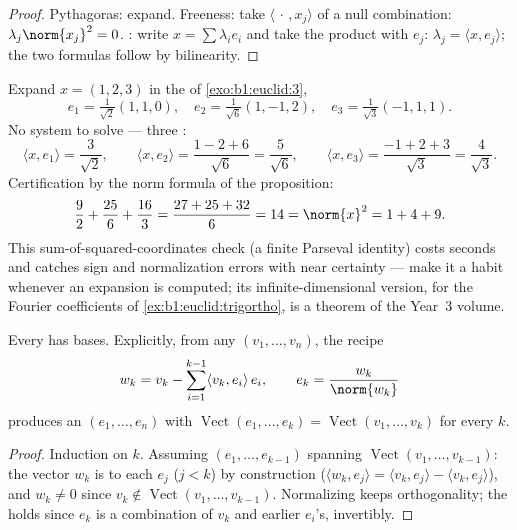 \begin{proof}
Pythagoras: expand. Freeness: take $\langle\,\cdot\,, x_j\rangle$
of a null combination: $\lambda_j \norm{x_j}^2 = 0$. :
write $x = \sum \lambda_i e_i$ and take the product with $e_j$:
$\lambda_j = \langle x, e_j\rangle$; the two formulas follow by
bilinearity.
\end{proof}

\begin{example}
\label{ex:b1:euclid:parsevalcheck}
Expand $x = (1, 2, 3)$ in the   of
\cref{exo:b1:euclid:3},
\[
e_1 = \tfrac{1}{\sqrt2}(1,1,0), \quad
e_2 = \tfrac{1}{\sqrt6}(1,-1,2), \quad
e_3 = \tfrac{1}{\sqrt3}(-1,1,1).
\]
No system to solve --- three :
\[
\langle x, e_1\rangle = \frac{3}{\sqrt2},
\qquad
\langle x, e_2\rangle = \frac{1 - 2 + 6}{\sqrt6} =
\frac{5}{\sqrt6},
\qquad
\langle x, e_3\rangle = \frac{-1 + 2 + 3}{\sqrt3} =
\frac{4}{\sqrt3}.
\]
Certification by the norm formula of the proposition:
\[
\frac{9}{2} + \frac{25}{6} + \frac{16}{3}
= \frac{27 + 25 + 32}{6} = 14 = \norm{x}^2 = 1 + 4 + 9 .
\]
This sum-of-squared-coordinates check (a finite Parseval
identity) costs seconds and catches sign and normalization
errors with near certainty --- make it a habit whenever an
 expansion is computed; its infinite-dimensional
version, for the Fourier coefficients of
\cref{ex:b1:euclid:trigortho}, is a theorem of the Year~3
volume.
\end{example}

\begin{theorem}\label{thm:b1:euclid:gramschmidt}
Every  has  bases. Explicitly, from any
 $(v_1, \dots, v_n)$, the recipe
\[
w_k = v_k - \sum_{i=1}^{k-1} \langle v_k, e_i\rangle\, e_i ,
\qquad
e_k = \frac{w_k}{\norm{w_k}}
\]
produces an   $(e_1, \dots, e_n)$ with
$\operatorname{Vect}(e_1, \dots, e_k) = \operatorname{Vect}(v_1,
\dots, v_k)$ for every $k$.
\end{theorem}

\begin{proof}
Induction on $k$. Assuming $(e_1, \dots, e_{k-1})$ 
spanning $\operatorname{Vect}(v_1, \dots, v_{k-1})$: the vector
$w_k$ is  to each $e_j$ ($j < k$) by construction
($\langle w_k, e_j \rangle = \langle v_k, e_j\rangle - \langle v_k,
e_j\rangle$), and $w_k \neq 0$ since $v_k \notin
\operatorname{Vect}(v_1, \dots, v_{k-1})$. Normalizing keeps
orthogonality; the   holds since $e_k$ is a
combination of $v_k$ and earlier $e_i$'s, invertibly.
\end{proof}


